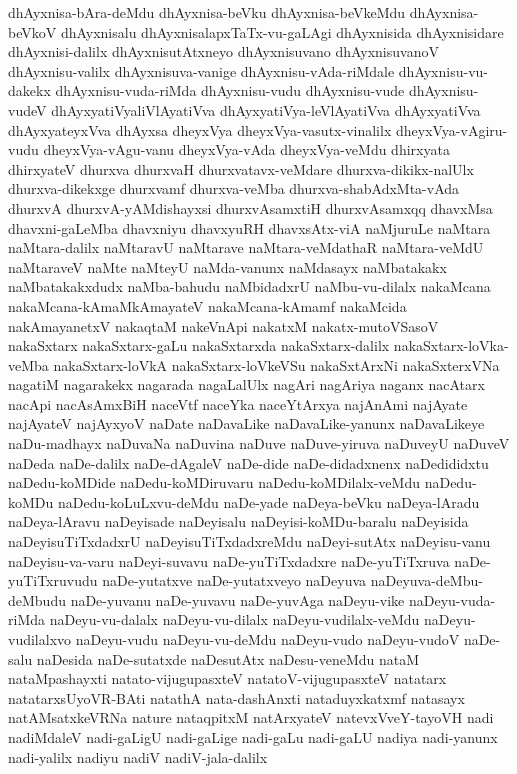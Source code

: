 {dhAyxnisa-bAra-deMdu
dhAyxnisa-beVku
dhAyxnisa-beVkeMdu
dhAyxnisa-beVkoV
dhAyxnisalu
dhAyxnisalapxTaTx-vu-gaLAgi
dhAyxnisida
dhAyxnisidare
dhAyxnisi-dalilx
dhAyxnisutAtxneyo
dhAyxnisuvano
dhAyxnisuvanoV
dhAyxnisu-valilx
dhAyxnisuva-vanige
dhAyxnisu-vAda-riMdale
dhAyxnisu-vu-dakekx
dhAyxnisu-vuda-riMda
dhAyxnisu-vudu
dhAyxnisu-vude
dhAyxnisu-vudeV
dhAyxyatiVyaliVlAyatiVva
dhAyxyatiVya-leVlAyatiVva
dhAyxyatiVva
dhAyxyateyxVva
dhAyxsa
dheyxVya
dheyxVya-vasutx-vinalilx
dheyxVya-vAgiru-vudu
dheyxVya-vAgu-vanu
dheyxVya-vAda
dheyxVya-veMdu
dhirxyata
dhirxyateV
dhurxva
dhurxvaH
dhurxvatavx-veMdare
dhurxva-dikikx-nalUlx
dhurxva-dikekxge
dhurxvamf
dhurxva-veMba
dhurxva-shabAdxMta-vAda
dhurxvA
dhurxvA-yAMdishayxsi
dhurxvAsamxtiH
dhurxvAsamxqq
dhavxMsa
dhavxni-gaLeMba
dhavxniyu
dhavxyuRH
dhavxsAtx-viA
naMjuruLe
naMtara
naMtara-dalilx
naMtaravU
naMtarave
naMtara-veMdathaR
naMtara-veMdU
naMtaraveV
naMte
naMteyU
naMda-vanunx
naMdasayx
naMbatakakx
naMbatakakxdudx
naMba-bahudu
naMbidadxrU
naMbu-vu-dilalx
nakaMcana
nakaMcana-kAmaMkAmayateV
nakaMcana-kAmamf
nakaMcida
nakAmayanetxV
nakaqtaM
nakeVnApi
nakatxM
nakatx-mutoVSasoV
nakaSxtarx
nakaSxtarx-gaLu
nakaSxtarxda
nakaSxtarx-dalilx
nakaSxtarx-loVka-veMba
nakaSxtarx-loVkA
nakaSxtarx-loVkeVSu
nakaSxtArxNi
nakaSxterxVNa
nagatiM
nagarakekx
nagarada
nagaLalUlx
nagAri
nagAriya
naganx
nacAtarx
nacApi
nacAsAmxBiH
naceVtf
naceYka
naceYtArxya
najAnAmi
najAyate
najAyateV
najAyxyoV
naDate
naDavaLike
naDavaLike-yanunx
naDavaLikeye
naDu-madhayx
naDuvaNa
naDuvina
naDuve
naDuve-yiruva
naDuveyU
naDuveV
naDeda
naDe-dalilx
naDe-dAgaleV
naDe-dide
naDe-didadxnenx
naDedididxtu
naDedu-koMDide
naDedu-koMDiruvaru
naDedu-koMDilalx-veMdu
naDedu-koMDu
naDedu-koLuLxvu-deMdu
naDe-yade
naDeya-beVku
naDeya-lAradu
naDeya-lAravu
naDeyisade
naDeyisalu
naDeyisi-koMDu-baralu
naDeyisida
naDeyisuTiTxdadxrU
naDeyisuTiTxdadxreMdu
naDeyi-sutAtx
naDeyisu-vanu
naDeyisu-va-varu
naDeyi-suvavu
naDe-yuTiTxdadxre
naDe-yuTiTxruva
naDe-yuTiTxruvudu
naDe-yutatxve
naDe-yutatxveyo
naDeyuva
naDeyuva-deMbu-deMbudu
naDe-yuvanu
naDe-yuvavu
naDe-yuvAga
naDeyu-vike
naDeyu-vuda-riMda
naDeyu-vu-dalalx
naDeyu-vu-dilalx
naDeyu-vudilalx-veMdu
naDeyu-vudilalxvo
naDeyu-vudu
naDeyu-vu-deMdu
naDeyu-vudo
naDeyu-vudoV
naDe-salu
naDesida
naDe-sutatxde
naDesutAtx
naDesu-veneMdu
nataM
nataMpashayxti
natato-vijugupasxteV
natatoV-vijugupasxteV
natatarx
natatarxsUyoVR-BAti
natathA
nata-dashAnxti
nataduyxkatxmf
natasayx
natAMsatxkeVRNa
nature
nataqpitxM
natArxyateV
natevxVveY-tayoVH
nadi
nadiMdaleV
nadi-gaLigU
nadi-gaLige
nadi-gaLu
nadi-gaLU
nadiya
nadi-yanunx
nadi-yalilx
nadiyu
nadiV
nadiV-jala-dalilx
}
